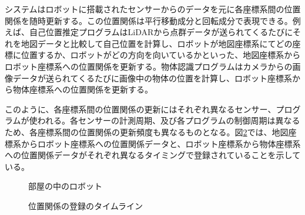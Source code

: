 \documentclass[a4paper]{jreport}	%
\begin{document}
システムはロボットに搭載されたセンサーからのデータを元に各座標系間の位置関係を随時更新する。この位置関係は平行移動成分と回転成分で表現できる。例えば、自己位置推定プログラムはLiDARから点群データが送られてくるたびにそれを地図データと比較して自己位置を計算し、ロボットが地図座標系にてどの座標に位置するか、ロボットがどの方向を向いているかといった、地図座標系からロボット座標系への位置関係を更新する。物体認識プログラムはカメラからの画像データが送られてくるたびに画像中の物体の位置を計算し、ロボット座標系から物体座標系への位置関係を更新する。

このように、各座標系間の位置関係の更新にはそれぞれ異なるセンサー、プログラムが使われる。各センサーの計測周期、及び各プログラムの制御周期は異なるため、各座標系間の位置関係の更新頻度も異なるものとなる。図\ref{fig:sensor-sync}では、地図座標系からロボット座標系への位置関係データと、ロボット座標系から物体座標系への位置関係データがそれぞれ異なるタイミングで登録されていることを示している。



\begin{figure}[h] 
\caption{部屋の中のロボット}
\label{fig:room}
\end{figure}

\begin{figure}[h] 
\caption{位置関係の登録のタイムライン}
\label{fig:sensor-sync}
\end{figure}
\end{document}
